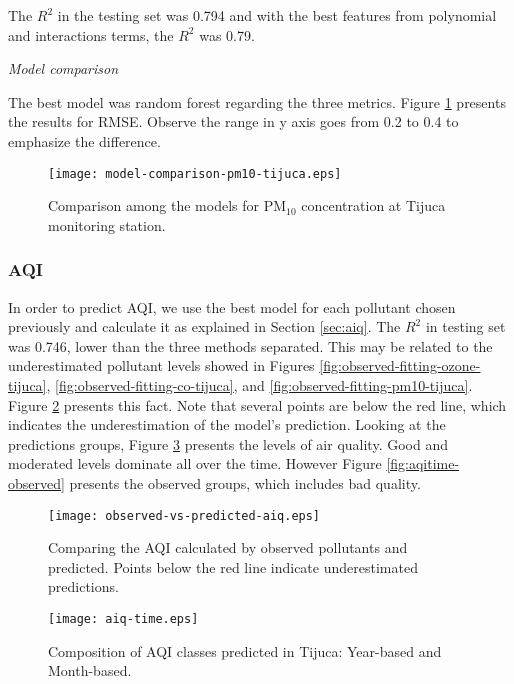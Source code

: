 \vspace{2mm}

The $R^2$ in the testing set was 0.794 and with the best features from
polynomial and interactions terms, the $R^2$ was 0.79.

{\em Model comparison} 

\vspace{2mm}

The best model was random forest regarding the three metrics. Figure
\ref{fig:model-comparison-pm10-tijuca} presents the results for RMSE. Observe
the range in y axis goes from 0.2 to 0.4 to emphasize the difference.

\begin{figure}
    \centering
    \texttt{[image: model-comparison-pm10-tijuca.eps]}
    \caption{Comparison among the models for PM$_{10}$ concentration at Tijuca monitoring station.}
    \label{fig:model-comparison-pm10-tijuca}
\end{figure}

\subsubsection{AQI}

In order to predict AQI, we use the best model for each pollutant
chosen previously and calculate it as explained in Section
\ref{sec:aiq}. The $R^2$ in testing set was 0.746, lower than the three
methods separated. This may be related to the underestimated pollutant levels
showed in Figures \ref{fig:observed-fitting-ozone-tijuca},
\ref{fig:observed-fitting-co-tijuca}, and
\ref{fig:observed-fitting-pm10-tijuca}. Figure
\ref{fig:observed-vs-predicted-aqi} presents this fact. Note that several
points are below the red line, which indicates the underestimation of the
model's prediction. Looking at the predictions groups, Figure
\ref{fig:aqitime} presents the levels of air quality. Good and moderated
levels dominate all over the time. However Figure \ref{fig:aqitime-observed}
presents the observed groups, which includes bad quality. 

\begin{figure}
    \centering
    \texttt{[image: observed-vs-predicted-aiq.eps]}
    \caption{Comparing the AQI calculated by observed pollutants and predicted. Points below the red line indicate underestimated predictions.}
    \label{fig:observed-vs-predicted-aqi}
\end{figure}

\begin{figure}
    \centering
    \texttt{[image: aiq-time.eps]}
    \caption{Composition of AQI classes predicted in Tijuca: Year-based and Month-based.}
    \label{fig:aqitime}
\end{figure}


